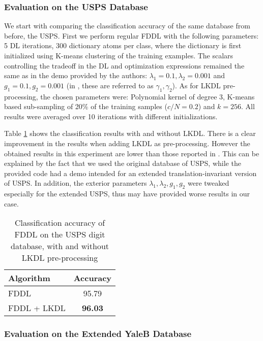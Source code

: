 \documentclass[journal]{IEEEtran}
\begin{document}
\subsubsection{Evaluation on the USPS Database}

We start with comparing the classification accuracy of the same database from before, the USPS. First we perform regular FDDL with the following parameters: 5 DL iterations, 300 dictionary atoms per class, where the dictionary is first initialized using K-means clustering of the training examples. The scalars controlling the tradeoff in the DL and optimization expressions remained the same as in the demo provided by the authors: $\lambda_1=0.1,\lambda_2=0.001$ and $g_1=0.1,g_2=0.001$ (in \cite{FDDL}, these are referred to as $\gamma_1,\gamma_2$). As for LKDL pre-processing, the chosen parameters were: Polynomial kernel of degree 3, K-means based sub-sampling of 20\% of the training samples ($c/N=0.2$) and $k=256$. All results were averaged over 10 iterations with different initializations.

Table \ref{table:FDDL USPS_performance} shows the classification results with and without LKDL. There is a clear improvement in the results when adding LKDL as pre-processing. However the obtained results in this experiment are lower than those reported in \cite{FDDL}. This can be explained by the fact that we used the original database of USPS, while the provided code had a demo intended for an extended translation-invariant version of USPS. In addition, the exterior parameters $\lambda_1,\lambda_2,g_1,g_2$ were tweaked especially for the extended USPS, thus may have provided worse results in our case.

\begin{table}[!t]
\caption{Classification accuracy of FDDL on the USPS digit database, with and without LKDL pre-processing}
\label{table:FDDL USPS_performance}
\centering
\begin{tabular}{||l||c||}
\multicolumn{1}{l}{\bf Algorithm}  &\multicolumn{1}{c}{\bf Accuracy} \\
\hline
FDDL & 95.79 \\
\hline
FDDL + LKDL & \textbf{96.03} \\
\hline
\end{tabular}
\end{table}

\subsubsection{Evaluation on the Extended YaleB Database}
\end{document}
